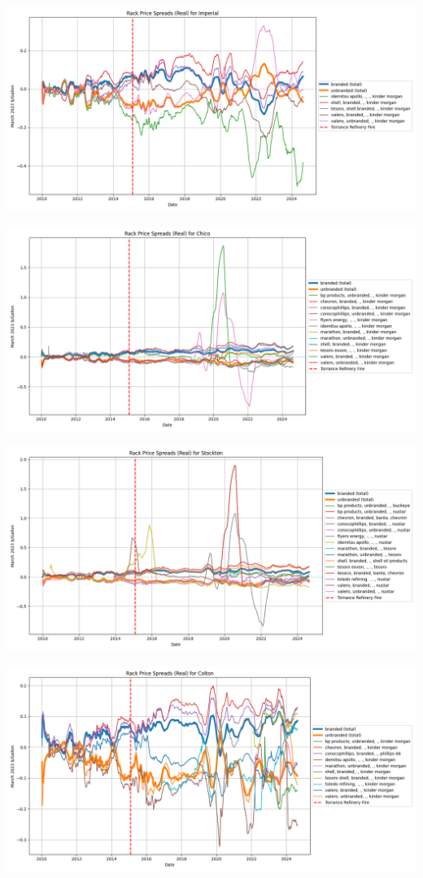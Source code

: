 \documentclass{article}
\begin{document}
\includegraphics[width=7in]{imperial_spread.png}

\includegraphics[width=7in]{chico_spread.png}

\includegraphics[width=7in]{stockton_spread.png}

\includegraphics[width=7in]{colton_spread.png}
\end{document}
